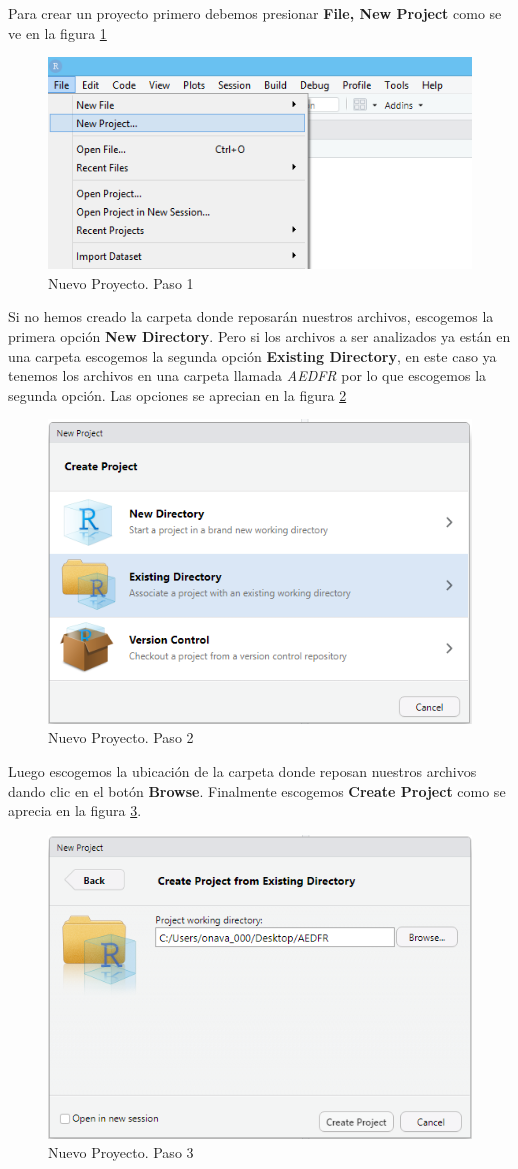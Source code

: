 \documentclass[letterpaper,]{book}
\begin{document}
Para crear un proyecto primero debemos presionar \textbf{File, New Project} como se ve en la figura \ref{fig:project1}

\begin{figure}[!h]

{\centering \includegraphics[width=0.45\linewidth]{project1} 

}

\caption{Nuevo Proyecto. Paso 1}\label{fig:project1}
\end{figure}

Si no hemos creado la carpeta donde reposarán nuestros archivos, escogemos la primera opción \textbf{New Directory}. Pero si los archivos a ser analizados ya están en una carpeta escogemos la segunda opción \textbf{Existing Directory}, en este caso ya tenemos los archivos en una carpeta llamada \emph{AEDFR} por lo que escogemos la segunda opción. Las opciones se aprecian en la figura \ref{fig:project2}

\begin{figure}[!h]

{\centering \includegraphics[width=0.45\linewidth]{project2} 

}

\caption{Nuevo Proyecto. Paso 2}\label{fig:project2}
\end{figure}

Luego escogemos la ubicación de la carpeta donde reposan nuestros archivos dando clic en el botón \textbf{Browse}. Finalmente escogemos \textbf{Create Project} como se aprecia en la figura \ref{fig:project3}.

\begin{figure}[!h]

{\centering \includegraphics[width=0.45\linewidth]{project3} 

}

\caption{Nuevo Proyecto. Paso 3}\label{fig:project3}
\end{figure}
\end{document}
